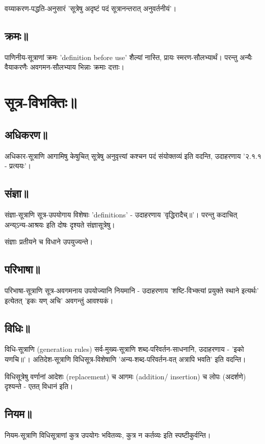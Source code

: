 \documentclass[oneside, article]{memoir}
\begin{document}
वय्याकरण-पद्धति-अनुसारं 'सूत्रेषु अदृष्टं पदं सूत्रानन्तरात् अनुवर्तनीयं'। 

\subsection{क्रमः॥}
पाणिनीय-सूत्राणां क्रमः 'definition before use' शैल्यां नास्ति, प्रायः स्मरण-सौलभ्यार्थं। परन्तु अन्यैः वैयाकरणैः अवगमन-सौलभ्याय भिन्नाः क्रमाः दत्ताः।

\section{सूत्र-विभक्तिः॥}
\subsection{अधिकरण॥}
अधिकार-सूत्राणि आगामिषु केषुचित् सूत्रेषु अनुवृत्त्यां कश्चन पदं संयोक्तव्यं इति वदन्ति, उदाहरणाय '२.१.१ - प्रत्ययः'।

\subsection{संज्ञा॥}
संज्ञा-सूत्राणि सूत्र-उपयोगाय विशेषाः 'definitions' - उदाहरणाय 'वृद्धिरादैच्॥'। परन्तु कदाचित् अन्य्ऽन्य-आश्रयः इति दोषः दृश्यते संज्ञासूत्रेषु।

संज्ञाः प्रतीयने च विधाने उपयुज्यन्ते।

\subsection{परिभाषा॥}
परिभाषा-सूत्राणि सूत्र-अवगमनाय उपयोज्यानि नियमानि - उदाहरणाय 'शष्टि-विभ्क्त्यां प्रयुक्ते स्थाने इत्यर्थः' इत्येतत् 'इकः यण् अचि' अवगन्तुं आवश्यकं।

\subsection{विधिः॥}
विधि-सूत्राणि (generation rules) सर्व-मुख्य-सूत्राणि शब्द-परिवर्तन-साधनानि, उदाहरणाय - 'इको यणचि॥'। अतिदेश-सूत्राणि विधिसूत्र-विशेषाणि 'अन्य-शब्द-परिवर्तन-वत् अत्रापि भवति' इति वदन्ति।

विधिसूत्रेषु वर्णानां आदेशः (replacement) च आगमः (addition/ insertion) च लोपः (अदर्शणे) दृश्यन्ते - एतत् विधानं इति।

\subsection{नियम॥}
नियम-सूत्राणि विधिसूत्राणां कुत्र उपयोगः भवितव्यः, कुत्र न कर्तव्यः इति स्पष्टीकुर्वन्ति।
\end{document}
